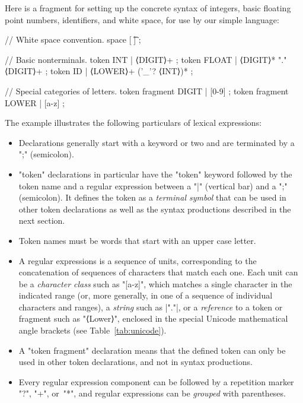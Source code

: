 \documentclass[11pt]{article} %
\begin{document}
\begin{example}\label{ex:lexical}
  Here is a \HAX fragment for setting up the concrete syntax of integers, basic floating point
  numbers, identifiers, and white space, for use by our simple language:
\begin{hacs}[xleftmargin=\parindent,numbers=right,texcl]
// White space convention.
space [ \t\n] ;

// Basic nonterminals.
token INT      | ⟨DIGIT⟩+ ;
token FLOAT    | ⟨DIGIT⟩* "." ⟨DIGIT⟩+ ;
token ID       | ⟨LOWER⟩+ ('_'? ⟨INT⟩)* ;

// Special categories of letters.
token fragment DIGIT  | [0-9] ;
token fragment LOWER  | [a-z] ;
\end{hacs}
  The example illustrates the following particulars of \HAX lexical expressions:
  \begin{itemize}

  \item Declarations generally start with a keyword or two and are terminated by a ";" (semicolon).

  \item "token" declarations in particular have the "token" keyword followed by the token name and a
    regular expression between a "|" (vertical bar) and a ";" (semicolon). It defines the token as a
    \emph{terminal symbol} that can be used in other token declarations as well as the syntax
    productions described in the next section.

  \item Token names must be words that start with an upper case letter.

  \item A regular expressions is a sequence of units, corresponding to the concatenation of
    sequences of characters that match each one.  Each unit can be a \emph{character class} such as
    "[a-z]", which matches a single character in the indicated range (or, more generally, in one of
    a sequence of individual characters and ranges), a \emph{string} such as \hacsc|"."|, or a
    \emph{reference} to a token or fragment such as "⟨Lower⟩", enclosed in the special Unicode
    mathematical angle brackets (see Table~\ref{tab:unicode}).

  \item A "token fragment" declaration means that the defined token can only be used in other token
    declarations, and not in syntax productions.

  \item Every regular expression component can be followed by a repetition marker "?", "+", or~"*",
    and regular expressions can be \emph{grouped} with parentheses.


\end{itemize}
\end{example}
\end{document}
